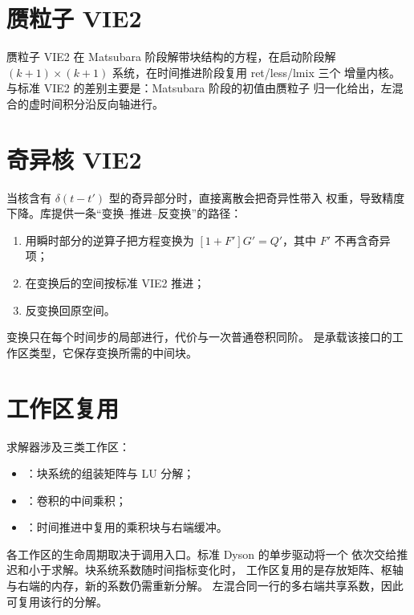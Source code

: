 \section{赝粒子 VIE2}
\label{sec:pseudo-vie2}

赝粒子 VIE2 在 Matsubara 阶段解带块结构的方程，在启动阶段解
$(k+1)\times(k+1)$ 系统，在时间推进阶段复用 ret/less/lmix 三个
增量内核。与标准 VIE2 的差别主要是：Matsubara 阶段的初值由赝粒子
归一化给出，左混合的虚时间积分沿反向轴进行。

\section{奇异核 VIE2}
\label{sec:singular-vie2}

当核含有 $\delta(t-t')$ 型的奇异部分时，直接离散会把奇异性带入
权重，导致精度下降。库提供一条“变换--推进--反变换”的路径：
\begin{enumerate}[label=(\arabic*)]
    \item 用瞬时部分的逆算子把方程变换为
          $[1+F']G' = Q'$，其中 $F'$ 不再含奇异项；
    \item 在变换后的空间按标准 VIE2 推进；
    \item 反变换回原空间。
\end{enumerate}
变换只在每个时间步的局部进行，代价与一次普通卷积同阶。
是承载该接口的工作区类型，它保存变换所需的中间块。

\section{工作区复用}
\label{sec:solver-workspace}

求解器涉及三类工作区：
\begin{itemize}
    \item {}：块系统的组装矩阵与 LU 分解；
    \item {}：卷积的中间乘积；
    \item {}：时间推进中复用的乘积块与右端缓冲。
\end{itemize}
各工作区的生命周期取决于调用入口。标准 Dyson 的单步驱动将一个
 依次交给推迟和小于求解。块系统系数随时间指标变化时，
工作区复用的是存放矩阵、枢轴与右端的内存，新的系数仍需重新分解。
左混合同一行的多右端共享系数，因此可复用该行的分解。
